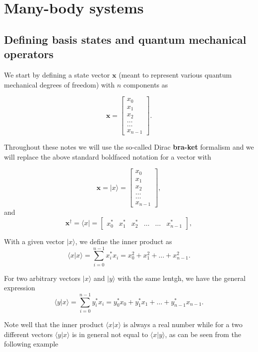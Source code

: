 
\chapter{Many-body systems}

\section{Defining basis states and quantum mechanical operators}

We start by defining a state vector $\bm{x}$ (meant to represent
various quantum mechanical degrees of freedom) with $n$ components as

\[
\bm{x} = \begin{bmatrix} x_0\\ x_1 \\ x_2 \\ \dots \\ \dots \\ x_{n-1} \end{bmatrix}.
\]

Throughout these notes we will use the so-called Dirac \textbf{bra-ket}
formalism and we will replace the above standard boldfaced notation
for a vector with

\[
\bm{x} = \vert x \rangle = \begin{bmatrix} x_0\\ x_1 \\ x_2 \\ \dots \\ \dots \\ x_{n-1} \end{bmatrix},
\]
and
\[
\bm{x}^{\dagger} = \langle x \vert = \begin{bmatrix} x_0^* & x_1^* & x_2^* & \dots & \dots & x_{n-1}^* \end{bmatrix},
\]

With a given vector $\vert x \rangle$, we define the inner product as
\[
\langle x \vert x\rangle = \sum_{i=0}^{n-1} x_i^*x_i=x_0^2+x_1^2+\dots + x_{n-1}^2. 
\]

For two arbitrary vectors $\vert x\rangle$ and $\vert y\rangle$ with the same lentgh, we have the
general expression
\[
\langle y \vert x\rangle = \sum_{i=0}^{n-1} y_i^*x_i=y_0^*x_0+y_1^*x_1+\dots + y_{n-1}^*x_{n-1}. 
\]

Note well that the inner product $\langle x \vert x\rangle$ is always a real number while for a two different vectors $\langle y \vert x\rangle$ is in general not equal to
$\langle x \vert y\rangle$, as can be seen from the following example


